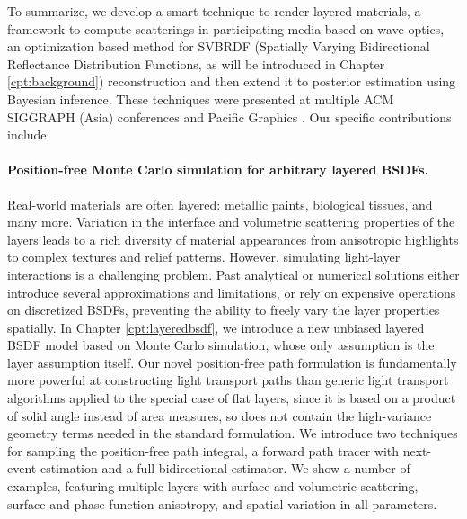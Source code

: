 To summarize, we develop a smart technique to render layered materials, a framework to compute scatterings in participating media based on wave optics, an optimization based method for SVBRDF (Spatially Varying Bidirectional Reflectance Distribution Functions,
as will be introduced in Chapter \ref{cpt:background}) reconstruction and then extend it to posterior estimation using Bayesian inference.
These techniques were presented at multiple ACM SIGGRAPH (Asia) conferences \cite{guo2018position, guo2021beyond, guo2020materialgan} and Pacific Graphics \cite{guo2020bayesian}. Our specific contributions include:

\paragraph{Position-free Monte Carlo simulation for arbitrary layered BSDFs.}
Real-world materials are often layered: metallic paints, biological tissues, and many more. Variation in the interface and volumetric scattering properties of the layers leads to a rich diversity of material appearances from anisotropic highlights to complex textures and relief patterns. However, simulating light-layer interactions is a challenging problem. Past analytical or numerical solutions either introduce several approximations and limitations, or rely on expensive operations on discretized BSDFs, preventing the ability to freely vary the layer properties spatially. 
In Chapter \ref{cpt:layeredbsdf}, we introduce a new unbiased layered BSDF model based on Monte Carlo simulation, whose only assumption is the layer assumption itself. Our novel position-free path formulation is fundamentally more powerful at constructing light transport paths than generic light transport algorithms applied to the special case of flat layers, since it is based on a product of solid angle instead of area measures, so does not contain the high-variance geometry terms needed in the standard formulation. We introduce two techniques for sampling the position-free path integral, a forward path tracer with next-event estimation and a full bidirectional estimator. We show a number of examples, featuring multiple layers with surface and volumetric scattering, surface and phase function anisotropy, and spatial variation in all parameters.

